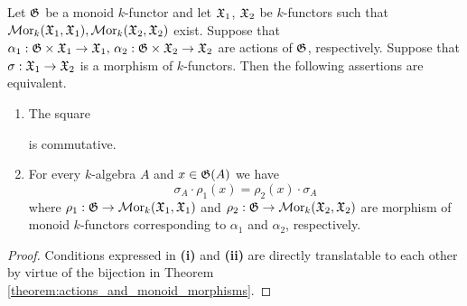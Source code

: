 \begin{proposition}\label{proposition:morphism_of_monoid_actions}
Let ${\mathfrak G}$ be a monoid $k$-functor and let ${\mathfrak X}_1$, ${\mathfrak X}_2$ be $k$-functors such that $\mathcal{M}\mathrm{or}_k({\mathfrak X}_1,{\mathfrak X}_1),\mathcal{M}\mathrm{or}_k({\mathfrak X}_2,{\mathfrak X}_2)$ exist. Suppose that $\alpha_1:{\mathfrak G}\times {\mathfrak X}_1 \rightarrow {\mathfrak X}_1,\,\alpha_2:{\mathfrak G}\times {\mathfrak X}_2 \rightarrow {\mathfrak X}_2$ are actions of ${\mathfrak G}$, respectively. Suppose that $\sigma:{\mathfrak X}_1\rightarrow {\mathfrak X}_2$ is a morphism of $k$-functors. Then the following assertions are equivalent.
\begin{enumerate}[label=\emph{\textbf{(\roman*)}}, leftmargin=1.5em]
\item The square
\begin{center}
\end{center}
is commutative.
\item For every $k$-algebra $A$ and $x\in {\mathfrak G}(A)$ we have
$$\sigma_A \cdot \rho_1(x) = \rho_2(x) \cdot \sigma_A$$
where $\rho_1:{\mathfrak G}\rightarrow \mathcal{M}\mathrm{or}_k({\mathfrak X}_1,{\mathfrak X}_1)$ and $\rho_2:{\mathfrak G}\rightarrow \mathcal{M}\mathrm{or}_{k}({\mathfrak X}_2,{\mathfrak X}_2)$ are morphism of monoid $k$-functors corresponding to $\alpha_1$ and $\alpha_2$, respectively.
\end{enumerate}
\end{proposition}
\begin{proof}
Conditions expressed in \textbf{(i)} and \textbf{(ii)} are directly translatable to each other by virtue of the bijection in Theorem \ref{theorem:actions_and_monoid_morphisms}. 
\end{proof}

